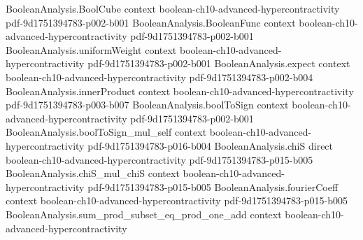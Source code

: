 \begin{theorem}
\leanok
{}
\label{BooleanAnalysis.Hypercontractivity.bridging_hypercontractivity}
\proofstep
  {BooleanAnalysis.BoolCube}
  {context}
  {boolean-ch10-advanced-hypercontractivity}
  {pdf-9d1751394783-p002-b001}
\proofstep
  {BooleanAnalysis.BooleanFunc}
  {context}
  {boolean-ch10-advanced-hypercontractivity}
  {pdf-9d1751394783-p002-b001}
\proofstep
  {BooleanAnalysis.uniformWeight}
  {context}
  {boolean-ch10-advanced-hypercontractivity}
  {pdf-9d1751394783-p002-b001}
\proofstep
  {BooleanAnalysis.expect}
  {context}
  {boolean-ch10-advanced-hypercontractivity}
  {pdf-9d1751394783-p002-b004}
\proofstep
  {BooleanAnalysis.innerProduct}
  {context}
  {boolean-ch10-advanced-hypercontractivity}
  {pdf-9d1751394783-p003-b007}
\proofstep
  {BooleanAnalysis.boolToSign}
  {context}
  {boolean-ch10-advanced-hypercontractivity}
  {pdf-9d1751394783-p002-b001}
\proofstep
  {BooleanAnalysis.boolToSign_mul_self}
  {context}
  {boolean-ch10-advanced-hypercontractivity}
  {pdf-9d1751394783-p016-b004}
\proofstep
  {BooleanAnalysis.chiS}
  {direct}
  {boolean-ch10-advanced-hypercontractivity}
  {pdf-9d1751394783-p015-b005}
\proofstep
  {BooleanAnalysis.chiS_mul_chiS}
  {context}
  {boolean-ch10-advanced-hypercontractivity}
  {pdf-9d1751394783-p015-b005}
\proofstep
  {BooleanAnalysis.fourierCoeff}
  {context}
  {boolean-ch10-advanced-hypercontractivity}
  {pdf-9d1751394783-p015-b005}
\proofstep
  {BooleanAnalysis.sum_prod_subset_eq_prod_one_add}
  {context}
  {boolean-ch10-advanced-hypercontractivity}

\end{theorem}
